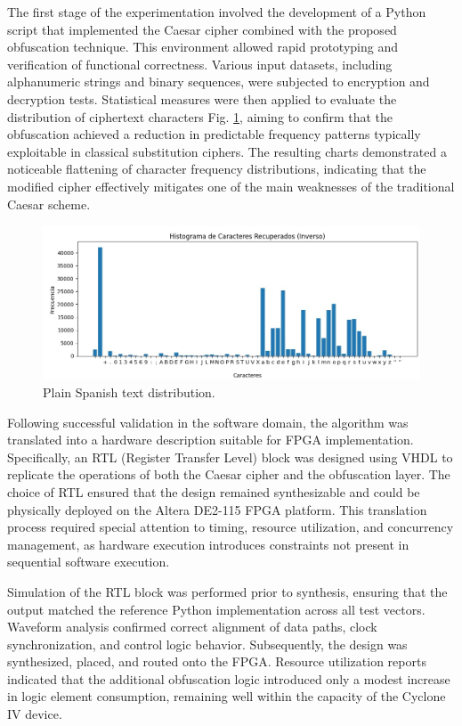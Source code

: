 \documentclass[journal,article,submit,pdftex,moreauthors]{Definitions/mdpi}
\begin{document}
The first stage of the experimentation involved the development of a Python script that implemented the Caesar cipher combined with the proposed obfuscation technique. This environment allowed rapid prototyping and verification of functional correctness. Various input datasets, including alphanumeric strings and binary sequences, were subjected to encryption and decryption tests. Statistical measures were then applied to evaluate the distribution of ciphertext characters Fig. \ref{fig1}, aiming to confirm that the obfuscation achieved a reduction in predictable frequency patterns typically exploitable in classical substitution ciphers. The resulting charts demonstrated a noticeable flattening of character frequency distributions, indicating that the modified cipher effectively mitigates one of the main weaknesses of the traditional Caesar scheme.

\begin{figure}[H]
 \includegraphics[width=1\textwidth, height=5 cm]{imagenes/img1} %
\caption{Plain Spanish text distribution.\label{fig1}}
\end{figure}   
\unskip


Following successful validation in the software domain, the algorithm was translated into a hardware description suitable for FPGA implementation. Specifically, an RTL (Register Transfer Level) block was designed using VHDL to replicate the operations of both the Caesar cipher and the obfuscation layer. The choice of RTL ensured that the design remained synthesizable and could be physically deployed on the Altera DE2-115 FPGA platform. This translation process required special attention to timing, resource utilization, and concurrency management, as hardware execution introduces constraints not present in sequential software execution.

Simulation of the RTL block was performed prior to synthesis, ensuring that the output matched the reference Python implementation across all test vectors. Waveform analysis confirmed correct alignment of data paths, clock synchronization, and control logic behavior. Subsequently, the design was synthesized, placed, and routed onto the FPGA. Resource utilization reports indicated that the additional obfuscation logic introduced only a modest increase in logic element consumption, remaining well within the capacity of the Cyclone IV device.
\end{document}
